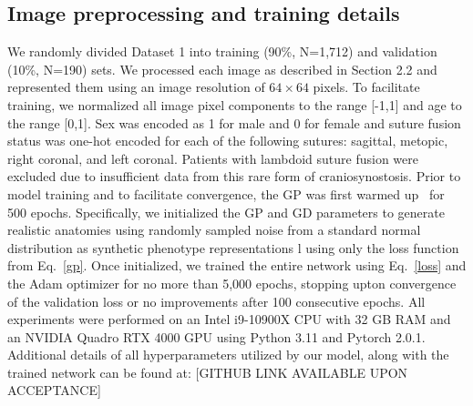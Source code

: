 \documentclass[conference]{IEEEtran}
\begin{document}
\subsection{Image preprocessing and training details}
We randomly divided Dataset 1 into training (90\%, N=1,712) and validation (10\%, N=190) sets. We processed each image as described in Section 2.2 and represented them using an image resolution of $64\times64$ pixels. To facilitate training, we normalized all image pixel components to the range [-1,1] and age to the range [0,1]. Sex was encoded as 1 for male and 0 for female and suture fusion status was one-hot encoded for each of the following sutures: sagittal, metopic, right coronal, and left coronal. Patients with lambdoid suture fusion were excluded due to insufficient data from this rare form of craniosynostosis.
 Prior to model training and to facilitate convergence, the GP was first warmed up~\cite{Grigoryev2022When} for 500 epochs. Specifically, we initialized the GP and GD parameters to generate realistic anatomies using randomly sampled noise from a standard normal distribution as synthetic phenotype representations l using only the loss function from Eq.~\ref{gp}. Once initialized, we trained the entire network using Eq.~\ref{loss} and the Adam optimizer for no more than 5,000 epochs, stopping upton convergence of the validation loss or no improvements after 100 consecutive epochs. All experiments were performed on an Intel i9-10900X CPU with 32 GB RAM and an NVIDIA Quadro RTX 4000 GPU using Python 3.11 and Pytorch 2.0.1. Additional details of all hyperparameters utilized by our model, along with the trained network can be found at: [GITHUB LINK AVAILABLE UPON ACCEPTANCE]
\end{document}
